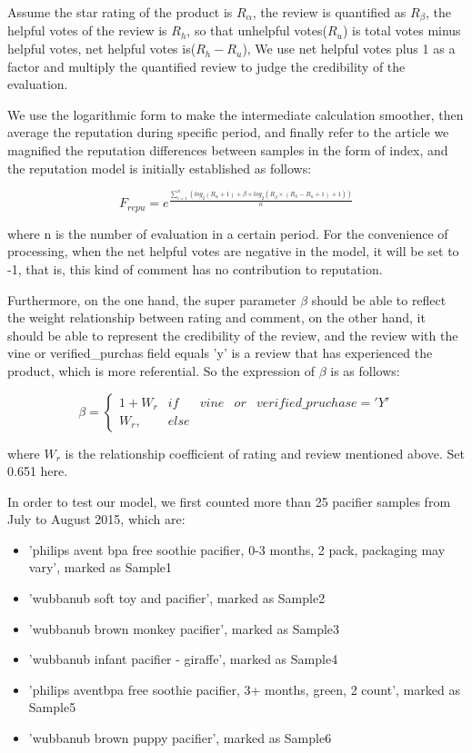 \documentclass{mcmthesis}
\begin{document}
Assume the star rating of the product is $R_{\alpha}$, the review is quantified as $R_{\beta}$, the helpful votes of the review is $R_{h}$, so that unhelpful votes($R_{u}$) is total votes minus helpful votes, net helpful votes is($R_{h}-R_{u}$), We use net helpful votes plus 1 as a factor and multiply the quantified review to judge the credibility of the evaluation.

We use the logarithmic form to make the intermediate calculation smoother, then average the reputation during specific period, and finally refer to the article\cite{subkhankulova2006comparative} we magnified the reputation differences between samples in the form of index, and the reputation model is initially established as follows:

\begin{equation}
	F_{repu} =  e^{\frac{\sum_{i=1}^{n}(log_2(R_{\alpha}+1)+ \beta \times log_2(R_{\beta}\times(R_{h}-R_{u}+1)+1))}{n}}
	\label{priA}
\end{equation}

where n is the number of evaluation in a certain period. For the convenience of processing, when the net helpful votes are negative in the model, it will be set to -1, that is, this kind of comment has no contribution to reputation.

Furthermore, on the one hand, the super parameter $\beta$ should be able to reflect the weight relationship between rating and comment, on the other hand, it should be able to represent the credibility of the review, and the review with the vine or verified\_purchas field equals 'y' is a review that has experienced the product, which is more referential. So the expression of $\beta$ is as follows:

\begin{equation}
	\beta =\left\{\begin{matrix}
1+W_{r} & if &vine &or &verified\_pruchase = 'Y'\\ 
W_{r},& else
\end{matrix}\right.
\label{hyperbeta}
\end{equation}

where $W_{r}$ is the relationship coefficient of rating and review mentioned above. Set 0.651 here.

In order to test our model, we first counted more than 25 pacifier samples from July to August 2015, which are:
\begin{itemize}
	\item 'philips avent bpa free soothie pacifier, 0-3 months, 2 pack, packaging may vary', marked as Sample1
	\item 'wubbanub soft toy and pacifier', marked as Sample2
	\item 'wubbanub brown monkey pacifier', marked as Sample3
	\item 'wubbanub infant pacifier - giraffe', marked as Sample4
	\item 'philips aventbpa free soothie pacifier, 3+ months, green, 2 count', marked as Sample5
	\item 'wubbanub brown puppy pacifier', marked as Sample6
\end{itemize}
\end{document}
